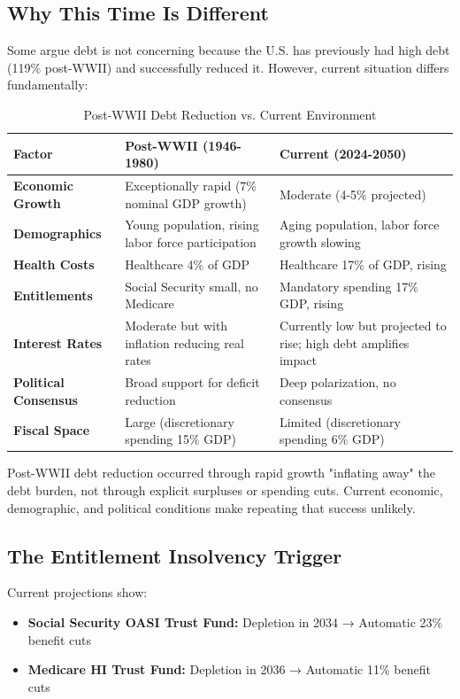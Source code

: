 \documentclass[12pt,letterpaper]{article}
\begin{document}
\subsection{Why This Time Is Different}

Some argue debt is not concerning because the U.S. has previously had high debt (119\% post-WWII) and successfully reduced it. However, current situation differs fundamentally:

\begin{table}[H]
\centering
\begin{tabular}{|p{3cm}|p{5.5cm}|p{5.5cm}|}
\hline
\textbf{Factor} & \textbf{Post-WWII (1946-1980)} & \textbf{Current (2024-2050)} \\
\hline
\textbf{Economic Growth} & Exceptionally rapid (7\% nominal GDP growth) & Moderate (4-5\% projected) \\
\hline
\textbf{Demographics} & Young population, rising labor force participation & Aging population, labor force growth slowing \\
\hline
\textbf{Health Costs} & Healthcare 4\% of GDP & Healthcare 17\% of GDP, rising \\
\hline
\textbf{Entitlements} & Social Security small, no Medicare & Mandatory spending 17\% GDP, rising \\
\hline
\textbf{Interest Rates} & Moderate but with inflation reducing real rates & Currently low but projected to rise; high debt amplifies impact \\
\hline
\textbf{Political Consensus} & Broad support for deficit reduction & Deep polarization, no consensus \\
\hline
\textbf{Fiscal Space} & Large (discretionary spending 15\% GDP) & Limited (discretionary spending 6\% GDP) \\
\hline
\end{tabular}
\caption{Post-WWII Debt Reduction vs. Current Environment}
\end{table}

Post-WWII debt reduction occurred through rapid growth "inflating away" the debt burden, not through explicit surpluses or spending cuts. Current economic, demographic, and political conditions make repeating that success unlikely.

\subsection{The Entitlement Insolvency Trigger}

Current projections show:
\begin{itemize}
    \item \textbf{Social Security OASI Trust Fund:} Depletion in 2034 → Automatic 23\% benefit cuts
    \item \textbf{Medicare HI Trust Fund:} Depletion in 2036 → Automatic 11\% benefit cuts
\end{itemize}
\end{document}
